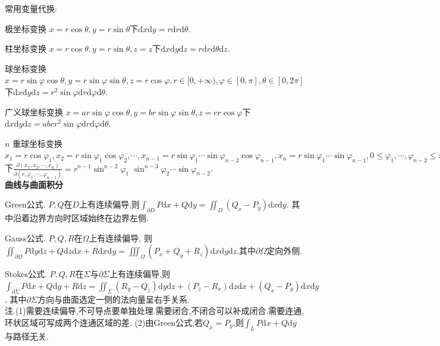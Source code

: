 \documentclass[UTF8]{ctexart}
\begin{document}
\noindent 常用变量代换:\par
极坐标变换 $x=r\cos\theta,y=r\sin\theta$下$\mathrm{d}x\mathrm{d}y=r\mathrm{d}r\mathrm{d}\theta$.\par
柱坐标变换 $x=r\cos\theta,y=r\sin\theta,z=z$下$\mathrm{d}x\mathrm{d}y\mathrm{d}z=r\mathrm{d}r\mathrm{d}\theta\mathrm{d}z$.\par
球坐标变换 $x=r\sin\varphi\cos\theta,y=r\sin\varphi\sin\theta,z=r\cos\varphi,
	r\in[0,+\infty),\varphi\in[0,\pi],\theta\in[0,2\pi]$下$\mathrm{d}x\mathrm{d}y\mathrm{d}z
	=r^2\sin\varphi \mathrm{d}r\mathrm{d}\varphi \mathrm{d}\theta$.\par
广义球坐标变换 $x=ar\sin\varphi\cos\theta,y=br\sin\varphi\sin\theta,z=cr\cos\varphi$下$\mathrm{d}x\mathrm{d}y\mathrm{d}z
	=abcr^2\sin\varphi \mathrm{d}r\mathrm{d}\varphi \mathrm{d}\theta$.\par
$n$ 重球坐标变换 $x_{1}=r \cos \varphi_{1}, x_{2}=r \sin \varphi_{1} \cos \varphi_{2}, \cdots,
	x_{n-1}=r \sin \varphi_{1}\cdots \sin \varphi_{n-2} \cos \varphi_{n-1},
	x_{n}=r \sin \varphi_{1}\cdots\sin \varphi_{n-1},
	0\leq \varphi_1,\cdots,\varphi_{n-2}\leq \pi,0\leq \varphi_{n-1}\leq 2\pi$下$
	\frac{\partial\left(x_{1}, x_{2}, \cdots, x_{n}\right)}{\partial\left(r, \varphi_{1}, \cdots, \varphi_{n-1}\right)}=
	r^{n-1} \sin ^{n-2} \varphi_{1}$
$\sin ^{n-3} \varphi_{2} \cdots \sin \varphi_{n-2} $. \\


\noindent \textbf{曲线与曲面积分} \par 
\noindent Green公式. $P,Q$在$D$上有连续偏导,则$\int _{\partial D}P\mathrm{d}x+Q\mathrm{d}y=\iint_D (Q_x-P_y)\mathrm{d}x\mathrm{d}y$.
其中沿着边界方向时区域始终在边界左侧.\par 
\noindent Gauss公式. $P,Q,R$在$\Omega $上有连续偏导,
则$\iint _{\partial \Omega}P\mathrm{d}y\mathrm{d}z+Q\mathrm{d}z\mathrm{d}x+R\mathrm{d}x\mathrm{d}y=
\iiint_{\Omega} (P_x+Q_y+R_z)\mathrm{d}x\mathrm{d}y\mathrm{d}z$.其中$\partial \Omega$定向外侧. \par 
\noindent Stokes公式.  $P,Q,R$在$\Sigma$与$\partial \Sigma$上有连续偏导,则
$\int _{\partial \Sigma}P\mathrm{d}x+Q\mathrm{d}y+R\mathrm{d}z=
\iint_{\Sigma} (R_y-Q_z)\mathrm{d}y\mathrm{d}z+(P_z-R_x)\mathrm{d}z\mathrm{d}x+(Q_x-P_y)\mathrm{d}x\mathrm{d}y$.
其中$\partial \Sigma$方向与曲面选定一侧的法向量呈右手关系. \\
\noindent 注.\quad (1)需要连续偏导,不可导点要单独处理.需要闭合,不闭合可以补成闭合.需要连通,环状区域可写成两个连通区域的差.\quad 
(2)由Green公式,若$Q_x=P_y$,则$\int _L P \mathrm{d}x+Q \mathrm{d}y$与路径无关.\\
\end{document}

